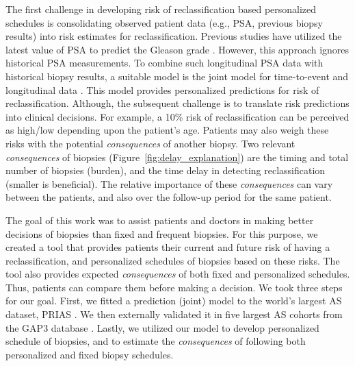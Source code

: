 The first challenge in developing risk of reclassification based personalized schedules is consolidating observed patient data (e.g., PSA, previous biopsy results) into risk estimates for reclassification. Previous studies have utilized the latest value of PSA to predict the Gleason grade \citep{partin1993use,makarov2007updated}. However, this approach ignores historical PSA measurements. To combine such longitudinal PSA data with historical biopsy results, a suitable model is the joint model for time-to-event and longitudinal data \citep{tomer2019,coley2017prediction,rizopoulos2012joint}. This model provides personalized predictions for risk of reclassification. Although, the subsequent challenge is to translate risk predictions into clinical decisions. For example, a 10\% risk of reclassification can be perceived as high/low depending upon the patient's age. Patients may also weigh these risks with the potential \textit{consequences} of another biopsy. Two relevant \textit{consequences} of biopsies (Figure~\ref{fig:delay_explanation}) are the timing and total number of biopsies (burden), and the time delay in detecting reclassification (smaller is beneficial). The relative importance of these \textit{consequences} can vary between the patients, and also over the follow-up period for the same patient.

The goal of this work was to assist patients and doctors in making better decisions of biopsies than fixed and frequent biopsies. For this purpose, we created a tool that provides patients their current and future risk of having a reclassification, and personalized schedules of biopsies based on these risks. The tool also provides expected \textit{consequences} of both fixed and personalized schedules. Thus, patients can compare them before making a decision. We took three steps for our goal. First, we fitted a prediction (joint) model to the world's largest AS dataset, PRIAS \citep{bul2013active}. We then externally validated it in five largest AS cohorts from the GAP3 database \citep{gap3_2018}. Lastly, we utilized our model to develop personalized schedule of biopsies, and to estimate the \textit{consequences} of following both personalized and fixed biopsy schedules.